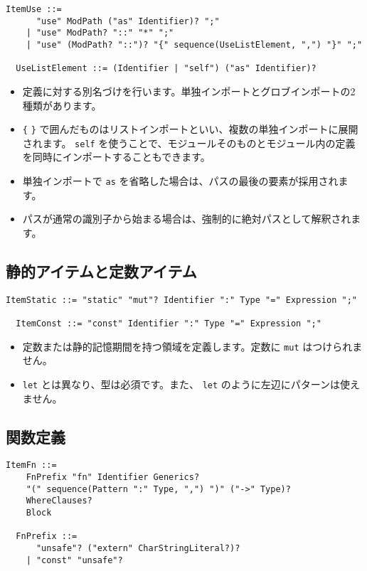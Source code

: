 \documentclass[dvipdfmx,uplatex,papersize,a4paper,10pt]{jsbook}
\theoremstyle{definition}
\begin{document}
\begin{lstlisting}[language=BNFLike, gobble=2]
  ItemUse ::=
      "use" ModPath ("as" Identifier)? ";"
    | "use" ModPath? "::" "*" ";"
    | "use" (ModPath? "::")? "{" sequence(UseListElement, ",") "}" ";"

  UseListElement ::= (Identifier | "self") ("as" Identifier)?
\end{lstlisting}

\begin{itemize}
  \item 定義に対する別名づけを行います。単独インポートとグロブインポートの2種類があります。
  \item \verb|{| \verb|}| で囲んだものはリストインポートといい、複数の単独インポートに展開されます。 \verb|self| を使うことで、モジュールそのものとモジュール内の定義を同時にインポートすることもできます。
  \item 単独インポートで \verb|as| を省略した場合は、パスの最後の要素が採用されます。
  \item パスが通常の識別子から始まる場合は、強制的に絶対パスとして解釈されます。
\end{itemize}

\subsection{静的アイテムと定数アイテム}

\begin{lstlisting}[language=BNFLike, gobble=2]
  ItemStatic ::= "static" "mut"? Identifier ":" Type "=" Expression ";"

  ItemConst ::= "const" Identifier ":" Type "=" Expression ";"
\end{lstlisting}

\begin{itemize}
  \item 定数または静的記憶期間を持つ領域を定義します。定数に \verb|mut| はつけられません。
  \item \verb|let| とは異なり、型は必須です。また、 \verb|let| のように左辺にパターンは使えません。
\end{itemize}

\subsection{関数定義}

\begin{lstlisting}[language=BNFLike, gobble=2]
  ItemFn ::=
    FnPrefix "fn" Identifier Generics?
    "(" sequence(Pattern ":" Type, ",") ")" ("->" Type)?
    WhereClauses?
    Block

  FnPrefix ::=
      "unsafe"? ("extern" CharStringLiteral?)?
    | "const" "unsafe"?
\end{lstlisting}
\end{document}
